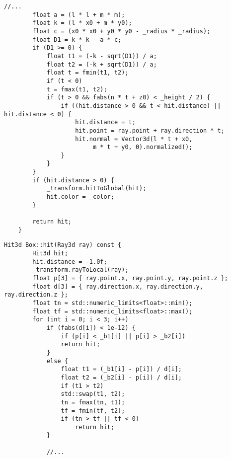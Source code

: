 \begin{center}
	\captionsetup{justification=raggedright,singlelinecheck=off}
	\begin{lstlisting}[label=lst:cylinder_hit_end, caption=Алгоритм нахождения пересечения луча с цилиндром (окончание)]
		//...
		float a = (l * l + m * m);
		float k = (l * x0 + m * y0);
		float c = (x0 * x0 + y0 * y0 - _radius * _radius);
		float D1 = k * k - a * c;		
		if (D1 >= 0) {
			float t1 = (-k - sqrt(D1)) / a;
			float t2 = (-k + sqrt(D1)) / a;
			float t = fmin(t1, t2);
			if (t < 0)
			t = fmax(t1, t2);
			if (t > 0 && fabs(n * t + z0) < _height / 2) {
				if ((hit.distance > 0 && t < hit.distance) || hit.distance < 0) {
					hit.distance = t;
					hit.point = ray.point + ray.direction * t;
					hit.normal = Vector3d(l * t + x0,
						 m * t + y0, 0).normalized();
				}
			}
		}
		if (hit.distance > 0) {
			_transform.hitToGlobal(hit);
			hit.color = _color;
		}
	
		return hit;
	}
	\end{lstlisting}
\end{center}

\clearpage

\begin{center}
	\captionsetup{justification=raggedright,singlelinecheck=off}
	\begin{lstlisting}[label=lst:box_hit_begin, caption=Алгоритм нахождения пересечения луча с параллелепипедом (начало)]
	Hit3d Box::hit(Ray3d ray) const {
		Hit3d hit;
		hit.distance = -1.0f;
		_transform.rayToLocal(ray);
		float p[3] = { ray.point.x, ray.point.y, ray.point.z };
		float d[3] = { ray.direction.x, ray.direction.y, ray.direction.z };
		float tn = std::numeric_limits<float>::min();
		float tf = std::numeric_limits<float>::max();
		for (int i = 0; i < 3; i++)
			if (fabs(d[i]) < 1e-12) {
				if (p[i] < _b1[i] || p[i] > _b2[i])
				return hit;
			}
			else {
				float t1 = (_b1[i] - p[i]) / d[i];
				float t2 = (_b2[i] - p[i]) / d[i];
				if (t1 > t2)
				std::swap(t1, t2);
				tn = fmax(tn, t1);
				tf = fmin(tf, t2);
				if (tn > tf || tf < 0)
					return hit;
			}
		
			//...
	\end{lstlisting}
\end{center}

\clearpage

